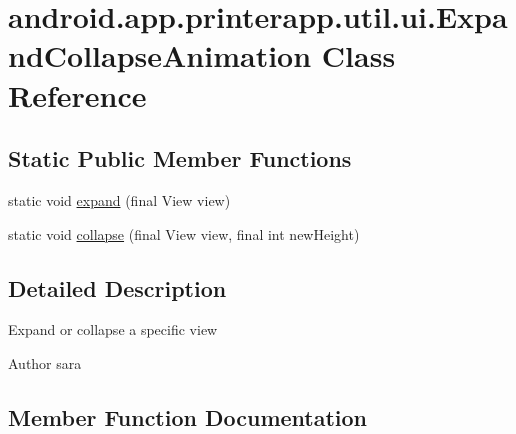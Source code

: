 \hypertarget{classandroid_1_1app_1_1printerapp_1_1util_1_1ui_1_1_expand_collapse_animation}{}\section{android.\+app.\+printerapp.\+util.\+ui.\+Expand\+Collapse\+Animation Class Reference}
\label{classandroid_1_1app_1_1printerapp_1_1util_1_1ui_1_1_expand_collapse_animation}
\subsection*{Static Public Member Functions}
\begin{DoxyCompactItemize}
\item 
static void \hyperlink{classandroid_1_1app_1_1printerapp_1_1util_1_1ui_1_1_expand_collapse_animation_aaff93d1476e50f6a8dc9ccce16df68e7}{expand} (final View view)
\item 
static void \hyperlink{classandroid_1_1app_1_1printerapp_1_1util_1_1ui_1_1_expand_collapse_animation_aa8ffb6335f599686967ddefabb4b589a}{collapse} (final View view, final int new\+Height)
\end{DoxyCompactItemize}


\subsection{Detailed Description}
Expand or collapse a specific view

\begin{DoxyAuthor}{Author}
sara 
\end{DoxyAuthor}


\subsection{Member Function Documentation}
\mbox{\label{classandroid_1_1app_1_1printerapp_1_1util_1_1ui_1_1_expand_collapse_animation_aa8ffb6335f599686967ddefabb4b589a}} 
